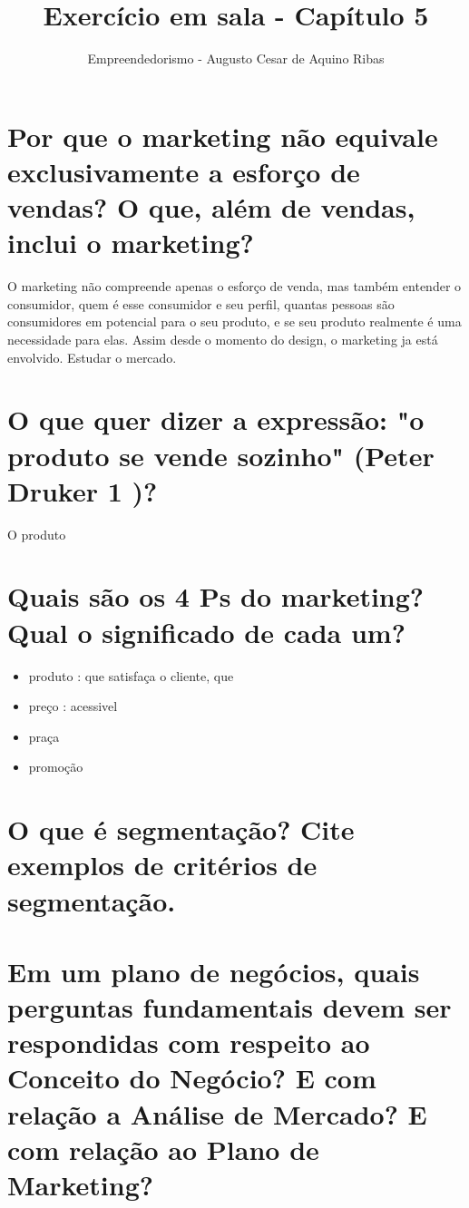 \documentclass[a4paper,10pt]{article}
\author{Empreendedorismo - Augusto Cesar de Aquino Ribas}
\title{Exercício em sala - Capítulo 5}
\begin{document}
\maketitle


\section{Por que o marketing não equivale exclusivamente a esforço de vendas? O que, além de vendas, inclui o marketing?}

O marketing não compreende apenas o esforço de venda, mas também entender o consumidor, quem é esse consumidor e seu perfil, quantas pessoas são consumidores em potencial para o seu produto, e se seu produto realmente é uma necessidade para elas. Assim desde o momento do design, o marketing ja está envolvido. Estudar o mercado.

\section{O que quer dizer a expressão: "o produto se vende sozinho" (Peter Druker 1 )?}

O produto 


\section{Quais são os 4 Ps do marketing? Qual o significado de cada um?}

\begin{itemize}
\item produto : que satisfaça o cliente, que 
\item preço : acessivel 
\item praça
\item promoção

\end{itemize}


\section{O que é segmentação? Cite exemplos de critérios de segmentação.}

\section{Em um plano de negócios, quais perguntas fundamentais devem ser respondidas com respeito ao Conceito do Negócio? E com relação a Análise de Mercado? E com relação ao Plano de Marketing?}
\end{document}

